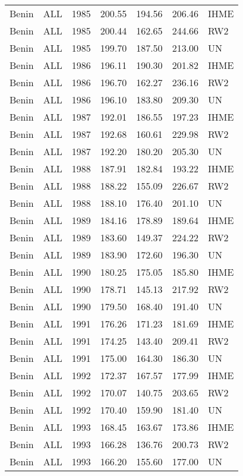 \begin{longtable}{lllrrrl}
  Benin & ALL & 1985 & 200.55 & 194.56 & 206.46 & IHME \\ 
  Benin & ALL & 1985 & 200.44 & 162.65 & 244.66 & RW2 \\ 
  Benin & ALL & 1985 & 199.70 & 187.50 & 213.00 & UN \\ 
  Benin & ALL & 1986 & 196.11 & 190.30 & 201.82 & IHME \\ 
  Benin & ALL & 1986 & 196.70 & 162.27 & 236.16 & RW2 \\ 
  Benin & ALL & 1986 & 196.10 & 183.80 & 209.30 & UN \\ 
  Benin & ALL & 1987 & 192.01 & 186.55 & 197.23 & IHME \\ 
  Benin & ALL & 1987 & 192.68 & 160.61 & 229.98 & RW2 \\ 
  Benin & ALL & 1987 & 192.20 & 180.20 & 205.30 & UN \\ 
  Benin & ALL & 1988 & 187.91 & 182.84 & 193.22 & IHME \\ 
  Benin & ALL & 1988 & 188.22 & 155.09 & 226.67 & RW2 \\ 
  Benin & ALL & 1988 & 188.10 & 176.40 & 201.10 & UN \\ 
  Benin & ALL & 1989 & 184.16 & 178.89 & 189.64 & IHME \\ 
  Benin & ALL & 1989 & 183.60 & 149.37 & 224.22 & RW2 \\ 
  Benin & ALL & 1989 & 183.90 & 172.60 & 196.30 & UN \\ 
  Benin & ALL & 1990 & 180.25 & 175.05 & 185.80 & IHME \\ 
  Benin & ALL & 1990 & 178.71 & 145.13 & 217.92 & RW2 \\ 
  Benin & ALL & 1990 & 179.50 & 168.40 & 191.40 & UN \\ 
  Benin & ALL & 1991 & 176.26 & 171.23 & 181.69 & IHME \\ 
  Benin & ALL & 1991 & 174.25 & 143.40 & 209.41 & RW2 \\ 
  Benin & ALL & 1991 & 175.00 & 164.30 & 186.30 & UN \\ 
  Benin & ALL & 1992 & 172.37 & 167.57 & 177.99 & IHME \\ 
  Benin & ALL & 1992 & 170.07 & 140.75 & 203.65 & RW2 \\ 
  Benin & ALL & 1992 & 170.40 & 159.90 & 181.40 & UN \\ 
  Benin & ALL & 1993 & 168.45 & 163.67 & 173.86 & IHME \\ 
  Benin & ALL & 1993 & 166.28 & 136.76 & 200.73 & RW2 \\ 
  Benin & ALL & 1993 & 166.20 & 155.60 & 177.00 & UN \\ 

\end{longtable}
